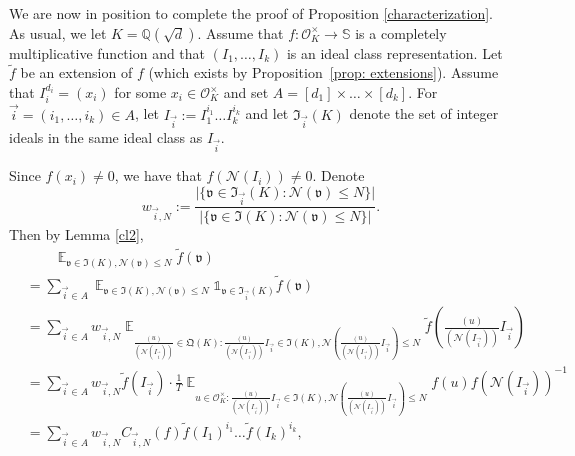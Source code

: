 \documentclass[11pt]{amsart}
\theoremstyle{definition}
\DeclareMathOperator*{\E}{\mathbb{E}}
\newcommand{\NN}{{\mathcal N}}
\newcommand{\Q}{{\mathbb Q}}
\renewcommand{\S}{\mathbb{S}}
\newcommand{\Z}{{\mathbb Z}}
\begin{document}
 We are now in position to complete the proof of Proposition \ref{characterization}. 
 As usual, we let $K=\Q(\sqrt{d})$. Assume that $f\colon\mathcal{O}_K^{\times}\to\S$ is a completely multiplicative function and that $(I_{1},\dots,I_{k})$ is an ideal class representation. Let $\tilde{f}$ be an extension of $f$ (which exists by Proposition~\ref{prop: extensions}).
 Assume that $I_{i}^{d_{i}}=(x_{i})$ for some $x_{i}\in\mathcal{O}_K^{\times}$ and set $A=[d_{1}]\times \dots\times [d_{k}]$. For $\vec{i}=(i_{1},\dots,i_{k})\in A$, let $I_{\vec{i}}:=I_{1}^{i_{1}}\dots I_{k}^{i_{k}}$ and let $\mathfrak{I}_{\vec{i}}(K)$ denote the set of integer ideals in the same ideal class as $I_{\vec{i}}$. 
    
    
   Since $f(x_{i})\neq 0$, we have that $f(\NN(I_{i}))\neq 0$.
Denote $$w_{\vec{i},N}:=\frac{\vert\{\mathfrak{v}\in \mathfrak{I}_{\vec{i}}(K)\colon \NN(\mathfrak{v})\leq N\}\vert}{\vert\{\mathfrak{v}\in \mathfrak{I}(K)\colon \NN(\mathfrak{v})\leq N\}\vert}.$$
 Then by  Lemma \ref{cl2},
    \begin{equation}\label{fweopf0}
    \begin{split}
        &\qquad \E_{\mathfrak{v}\in \mathfrak{I}(K), \NN(\mathfrak{v})\leq N}\tilde{f}(\mathfrak{v})
        \\&=\sum_{\vec{i}\in A} \E_{\mathfrak{v}\in \mathfrak{I}(K), \NN(\mathfrak{v})\leq N}\mathds{1}_{\mathfrak{v}\in \mathfrak{I}_{\vec{i}}(K)}\tilde{f}(\mathfrak{v})
        \\&=\sum_{\vec{i}\in A}w_{\vec{i},N} \E_{\frac{(u)}{(\NN(I_{\vec{i}}))}\in \mathfrak{Q}(K)\colon \frac{(u)}{(\NN(I_{\vec{i}}))}I_{\vec{i}}\in \mathfrak{I}(K), \NN(\frac{(u)}{(\NN(I_{\vec{i}}))}I_{\vec{i}})\leq N} \tilde{f}\left(\frac{(u)}{(\NN(I_{\vec{i}}))}I_{\vec{i}}\right)
        \\&=\sum_{\vec{i}\in A}w_{\vec{i},N}\tilde{f}(I_{\vec{i}})\cdot  \frac{1}{T}\E_{u\in \mathcal{O}_K^{\times}\colon \frac{(u)}{(\NN(I_{\vec{i}}))}I_{\vec{i}}\in \mathfrak{I}(K), \NN(\frac{(u)}{(\NN(I_{\vec{i}}))}I_{\vec{i}})\leq N} f(u)f(\NN(I_{\vec{i}}))^{-1}
        \\&=\sum_{\vec{i}\in A}w_{\vec{i},N}C_{\vec{i},N}(f)\tilde{f}(I_{1})^{i_{1}}\dots \tilde{f}(I_{k})^{i_{k}}, 
    \end{split}
\end{equation}
\end{document}
